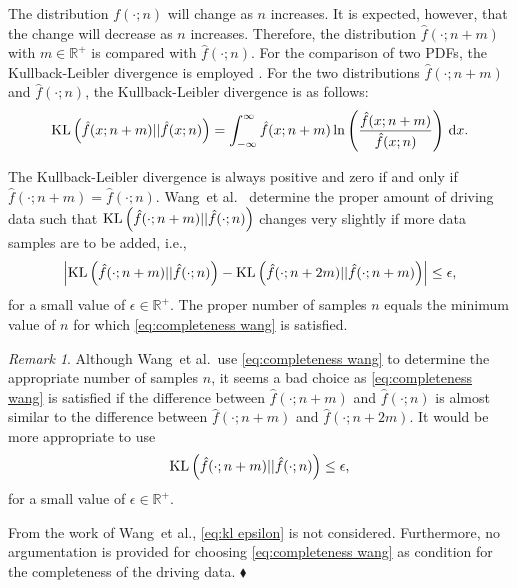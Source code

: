 \documentclass[10pt,final,a4paper,oneside,onecolumn]{article}
\newcommand*{\ud}{\mathrm{\,d}}                                 %
\newcommand*{\etal}{et al.}                                     %
\newcommand{\kl}[2]{\textup{KL} \left( #1 || #2 \right)}
\theoremstyle{plain}\newtheorem{definition}{Definition}[section]    %
\theoremstyle{definition}\newtheorem{example}{Example}[section]     %
\theoremstyle{remark}\newtheorem{remarkenv}{Remark}[section]        %
\newenvironment{remark}{\begin{remarkenv}}%
                       {\hfill$\blacklozenge$\end{remarkenv}}       %
\begin{document}
The distribution $f(\cdot;n)$ will change as $n$ increases. It is expected, however, that the change will decrease as $n$ increases. Therefore, the distribution $\hat{f}(\cdot;n+m)$ with $m \in \mathds{R}^+$ is compared with $\hat{f}(\cdot;n)$. For the comparison of two PDFs, the Kullback-Leibler divergence is employed \cite{kullback1951, bishop2006pattern}. For the two distributions $\hat{f}(\cdot;n+m)$ and $\hat{f}(\cdot;n)$, the Kullback-Leibler divergence is as follows:
\begin{equation} \label{eq:KL divergence}
	\kl{\hat{f}(x;n+m)}{\hat{f}(x;n)} = \int_{-\infty}^{\infty} \hat{f}(x;n+m) \ln \left( \frac{\hat{f}(x;n+m)}{\hat{f}(x;n)} \right) \ud x.
\end{equation}

The Kullback-Leibler divergence is always positive and zero if and only if $\hat{f}(\cdot;n+m) = \hat{f}(\cdot;n)$. Wang~\etal\ \cite{wang2017much} determine the proper amount of driving data such that $\kl{\hat{f}(\cdot;n+m)}{\hat{f}(\cdot;n)}$ changes very slightly if more data samples are to be added, i.e.,
\begin{equation} \label{eq:completeness wang}
	\left| \kl{\hat{f}(\cdot;n+m)}{\hat{f}(\cdot;n)} - \kl{\hat{f}(\cdot;n+2m)}{\hat{f}(\cdot;n+m)} \right| \leq \epsilon,
\end{equation}
for a small value of $\epsilon\in\mathds{R}^+$. The proper number of samples $n$ equals the minimum value of $n$ for which \cref{eq:completeness wang} is satisfied.

\begin{remark}
	Although Wang~\etal\ use \cref{eq:completeness wang} to determine the appropriate number of samples $n$, it seems a bad choice as \cref{eq:completeness wang} is satisfied if the difference between $\hat{f}(\cdot;n+m)$ and $\hat{f}(\cdot;n)$ is almost similar to the difference between $\hat{f}(\cdot;n+m)$ and $\hat{f}(\cdot;n+2m)$. It would be more appropriate to use
	\begin{equation} \label{eq:kl epsilon}
		\kl{\hat{f}(\cdot;n+m)}{\hat{f}(\cdot;n)} \leq \epsilon,
	\end{equation}
	for a small value of $\epsilon\in\mathds{R}^+$.
	
	From the work of Wang~\etal, \cref{eq:kl epsilon} is not considered. Furthermore, no argumentation is provided for choosing \cref{eq:completeness wang} as condition for the completeness of the driving data.
\end{remark}
\end{document}
